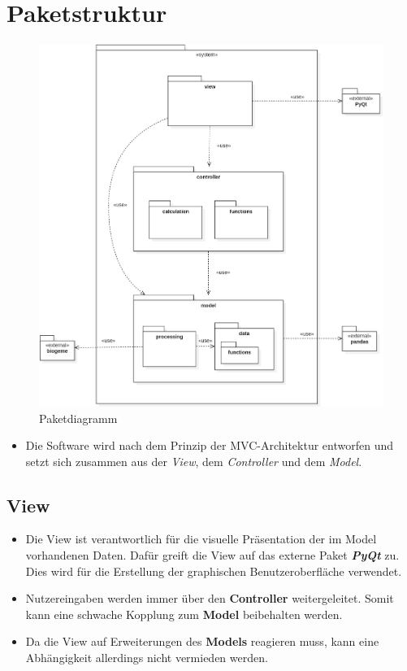 \documentclass{article}
\begin{document}
\section{Paketstruktur}
\begin{figure}[H]%
    \centering
    \includegraphics[width=13cm]{img/PackageDiagram.png}
    \caption{Paketdiagramm}
\end{figure}

\begin{itemize}
\item Die Software wird nach dem Prinzip der MVC-Architektur entworfen und setzt sich zusammen aus der \emph{View}, dem \emph{Controller} und dem \emph{Model}.
\end{itemize}

\subsection{View}
\begin{itemize}
\item Die View ist verantwortlich für die visuelle Präsentation der im Model vorhandenen Daten. Dafür greift die View auf das externe Paket \textit{\textbf{PyQt}} zu. Dies wird für die Erstellung der graphischen Benutzeroberfläche verwendet.
\item Nutzereingaben werden immer über den \textbf{Controller} weitergeleitet. Somit kann eine schwache Kopplung zum \textbf{Model} beibehalten werden.
\item Da die View auf Erweiterungen des \textbf{Models} reagieren muss, kann eine Abhängigkeit allerdings nicht vermieden werden.
\end{itemize}
\end{document}
